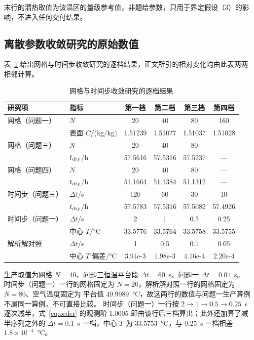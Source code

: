 末行的潜热取值为该温区的量级参考值，非题给参数，只用于界定假设（3）的影响，不进入任何交付结果。

\subsection{离散参数收敛研究的原始数值}

表~\ref{tab:conv} 给出网格与时间步收敛研究的逐档结果，正文所引的相对变化均由此表两两相邻计算。

\begin{table}[H]
\centering
\caption{网格与时间步收敛研究的逐档结果}\label{tab:conv}
\begin{tabular}{llcccc}
\toprule
研究项 & 指标 & 第一档 & 第二档 & 第三档 & 第四档 \\
\midrule
网格（问题一） & $N$                  & 20      & 40      & 80      & 160 \\
                & 表面 $C$/(kg/kg)     & 1.51239 & 1.51077 & 1.51037 & 1.51028 \\
网格（问题三） & $N$                  & 20      & 40      & 80      & --- \\
                & $t_{\rm dry}$/h      & 57.5616 & 57.5316 & 57.5237 & --- \\
网格（问题四） & $N$                  & 20      & 40      & 80      & --- \\
                & $t_{\rm dry}$/h      & 51.1664 & 51.1384 & 51.1312 & --- \\
时间步（问题三）& $\Delta t$/s         & 120     & 60      & 30      & 10 \\
                & $t_{\rm dry}$/h      & 57.5783 & 57.5316 & 57.5082 & 57.4926 \\
时间步（问题一）& $\Delta t$/s         & 2       & 1       & 0.5     & 0.25 \\
                & 中心 $T$/°C          & 33.5776 & 33.5764 & 33.5758 & 33.5755 \\
解析解对照     & $\Delta t$/s         & 1       & 0.5     & 0.1     & 0.05 \\
                & 中心 $T$ 偏差/°C     & 3.94e-3 & 1.98e-3 & 4.16e-4 & 2.20e-4 \\
\bottomrule
\end{tabular}

\vspace{0.6em}
\begin{minipage}{0.94\textwidth}
\footnotesize 生产取值为网格 $N=40$、问题三恒温平台段 $\Delta t=60$~s、问题一 $\Delta t=0.01$~s。
时间步（问题一）一行的网格固定为 $N=20$，解析解对照一行的网格固定为 $N=80$、空气温度固定为
平台值 $49.9989$~°C，故这两行的数值与问题一生产算例不属同一算例，不可直接比较。
时间步（问题一）一行按 $2\to1\to0.5\to0.25$~s 逐次减半，式~\eqref{eq:order} 的观测阶 $1.0005$
即由该行后三档算出；此外还加算了减半序列之外的 $\Delta t=0.1$~s 一档，中心 $T$ 为
$33.5753$~°C，与 $0.25$~s 一档相差 $1.8\times10^{-4}$~°C。
\end{minipage}
\end{table}
